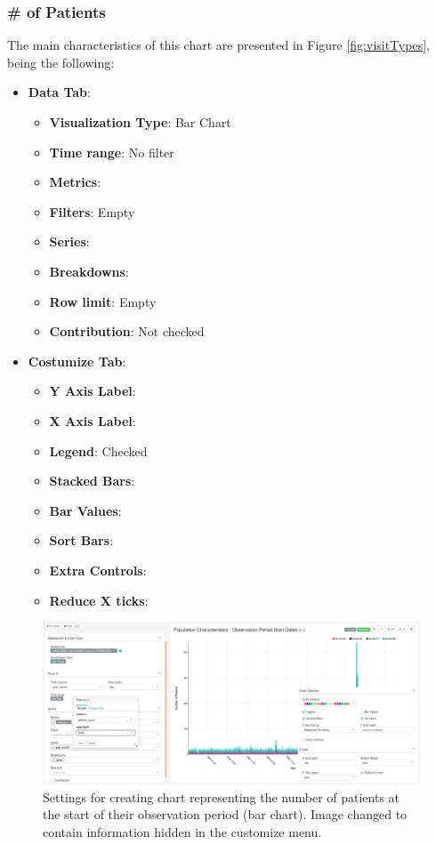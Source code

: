 \documentclass[]{book}
\providecommand{\tightlist}{%
  \setlength{\itemsep}{0pt}\setlength{\parskip}{0pt}}
\begin{document}
\subsubsection{\# of Patients}\label{of-patients}

The main characteristics of this chart are presented in Figure
\ref{fig:visitTypes}, being the following:

\begin{itemize}
\tightlist
\item
  \textbf{Data Tab}:

  \begin{itemize}
  \tightlist
  \item
    \textbf{Visualization Type}: Bar Chart
  \item
    \textbf{Time range}: No filter
  \item
    \textbf{Metrics}:
  \item
    \textbf{Filters}: Empty
  \item
    \textbf{Series}:
  \item
    \textbf{Breakdowns}:
  \item
    \textbf{Row limit}: Empty
  \item
    \textbf{Contribution}: Not checked
  \end{itemize}
\item
  \textbf{Costumize Tab}:

  \begin{itemize}
  \tightlist
  \item
    \textbf{Y Axis Label}:
  \item
    \textbf{X Axis Label}:
  \item
    \textbf{Legend}: Checked
  \item
    \textbf{Stacked Bars}:
  \item
    \textbf{Bar Values}:
  \item
    \textbf{Sort Bars}:
  \item
    \textbf{Extra Controls}:
  \item
    \textbf{Reduce X ticks}:
  \end{itemize}
\end{itemize}

\begin{figure}
\includegraphics[width=1\linewidth]{images/populationCharacteristicsObservationPeriodStartDates} \caption{Settings for creating chart representing the number of patients at the start of their observation period (bar chart). Image changed to contain information hidden in the customize menu.}\label{fig:visitTypes5}
\end{figure}
\end{document}
